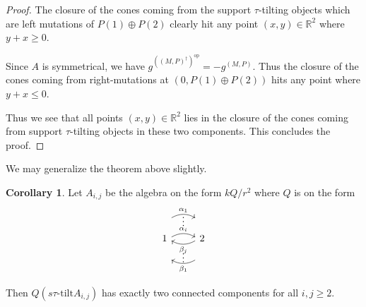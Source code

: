 \documentclass[]{article}
\theoremstyle{definition}
\newtheorem{corollary}{Corollary}[section]
\newcommand{\tu}{\ensuremath{\tau}}
\begin{document}
\begin{proof}
	The closure of the cones coming from the support \tu-tilting objects which are left mutations of $P(1) \oplus P(2)$ clearly hit any point $(x,y) \in \mathbb{R}^2$ where $y + x \geq 0$. 
	
	Since $A$ is symmetrical, we have $g^{((M,P)^\dagger)^\text{op}} = -g^{(M,P)}$. Thus the closure of the cones coming from right-mutations at $(0,P(1) \oplus P(2))$ hits any point where $y + x \leq 0$. 
	
	Thus we see that all points $(x,y) \in \mathbb{R}^2$ lies in the closure of the cones coming from support \tu-tilting objects in these two components. This concludes the proof.
	
	
\end{proof}

We may generalize the theorem above slightly.
\begin{corollary}
	Let $A_{i,j}$ be the algebra on the form $kQ/r^2$ where $Q$ is on the form
	\[\begin{tikzcd}
	1
	\arrow[r, shift right = -3.5ex, draw=none, "\raisebox{+2.5ex}{\vdots}" description]
	\arrow[r,bend left,shift right = 0.5ex, "\alpha_i"]
	\arrow[r,bend left, shift left = 4ex, "\alpha_1"]
	& 2 \arrow[l, shift left = 5.0ex, draw=none, "\raisebox{+2.5ex}{\vdots}" description]
	\arrow[l,bend left,shift right = 0.5ex,"\beta_j"]
	\arrow[l,bend left,shift left = 4.0ex, "\beta_1"]  \\
	\end{tikzcd}
	\]
	
	Then $Q(s\tu\text{-tilt} A_{i,j})$ has exactly two connected components for all $i,j \geq 2$.
	
\end{corollary}
\end{document}
